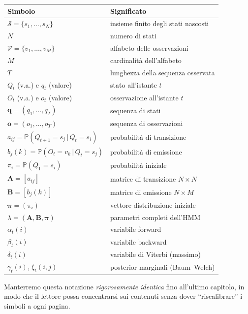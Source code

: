 \documentclass[11pt,a4paper,oneside]{book}
\theoremstyle{plain}
\theoremstyle{definition}
\theoremstyle{remark}
\newcommand{\Prob}{\mathbb{P}}
\newcommand{\states}{\mathcal{S}}            %
\newcommand{\obssym}{\mathcal{V}}            %
\newcommand{\Amat}{\mathbf{A}}               %
\newcommand{\Bmat}{\mathbf{B}}               %
\newcommand{\initvec}{\boldsymbol{\pi}}      %
\newcommand{\hmm}{\lambda}                   %
\newcommand{\Nstates}{N}                     %
\newcommand{\Msym}{M}                        %
\newcommand{\Tlen}{T}                        %
\newcommand{\seqobs}{\mathbf{o}}             %
\newcommand{\seqstates}{\mathbf{q}}          %
\newcommand{\fwd}{\alpha}                    %
\newcommand{\bwd}{\beta}                     %
\newcommand{\vit}{\delta}                    %
\newcommand{\gam}{\gamma}                    %
\newcommand{\xig}{\xi}                       %
\newcommand{\given}{\,\vert\,}
\begin{document}
\begin{tcolorbox}[notebox,title=Tabella di notazione (riferimento permanente)]
\begin{tabular}{ll}
\toprule
\textbf{Simbolo} & \textbf{Significato} \\
\midrule
$\states=\{s_1,\dots,s_{\Nstates}\}$ & insieme finito degli stati nascosti\\
$\Nstates$ & numero di stati \\
$\obssym=\{v_1,\dots,v_{\Msym}\}$ & alfabeto delle osservazioni \\
$\Msym$ & cardinalità dell'alfabeto \\
$\Tlen$ & lunghezza della sequenza osservata \\
$Q_t$ (v.a.) e $q_t$ (valore) & stato all'istante $t$ \\
$O_t$ (v.a.) e $o_t$ (valore) & osservazione all'istante $t$ \\
$\seqstates = (q_1,\dots,q_{\Tlen})$ & sequenza di stati \\
$\seqobs = (o_1,\dots,o_{\Tlen})$ & sequenza di osservazioni \\
$a_{ij} = \Prob(Q_{t+1}{=}s_j \given Q_t{=}s_i)$ & probabilità di transizione \\
$b_j(k) = \Prob(O_t{=}v_k \given Q_t{=}s_j)$ & probabilità di emissione \\
$\pi_i = \Prob(Q_1{=}s_i)$ & probabilità iniziale \\
$\Amat=[a_{ij}]$ & matrice di transizione $\Nstates\times\Nstates$ \\
$\Bmat=[b_j(k)]$ & matrice di emissione $\Nstates\times\Msym$ \\
$\initvec=(\pi_i)$ & vettore distribuzione iniziale \\
$\hmm = (\Amat,\Bmat,\initvec)$ & parametri completi dell'HMM \\
$\fwd_t(i)$ & variabile forward \\
$\bwd_t(i)$ & variabile backward \\
$\vit_t(i)$ & variabile di Viterbi (massimo) \\
$\gam_t(i)$, $\xig_t(i,j)$ & posterior marginali (Baum--Welch) \\
\bottomrule
\end{tabular}
\end{tcolorbox}

Manterremo questa notazione \emph{rigorosamente identica} fino
all'ultimo capitolo, in modo che il lettore possa concentrarsi sui
contenuti senza dover ``riscalibrare'' i simboli a ogni pagina.
\end{document}
